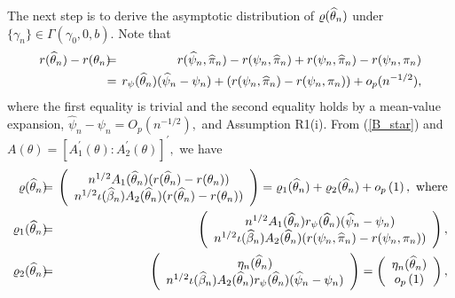 \documentclass[12pt,thmsb,titlepage,final,oneside,letterpaper]{article}
\begin{document}
The next step is to derive the asymptotic distribution of $\varrho (\widehat{%
\theta }_{n})$ under $\{\gamma _{n}\}\in \Gamma (\gamma _{0},0,b).$ Note that%
\begin{eqnarray}
r(\widehat{\theta }_{n})-r(\theta _{n})\hspace{-0.08in} &=&\hspace{-0.08in}r(%
\widehat{\psi }_{n},\widehat{\pi }_{n})-r(\psi _{n},\widehat{\pi }%
_{n})+r(\psi _{n},\widehat{\pi }_{n})-r(\psi _{n},\pi _{n})  \notag \\
&=&\hspace{-0.08in}r_{\psi }(\widehat{\theta }_{n})(\widehat{\psi }_{n}-\psi
_{n})+(r(\psi _{n},\widehat{\pi }_{n})-r(\psi _{n},\pi
_{n}))+o_{p}(n^{-1/2}),  \label{decomp}
\end{eqnarray}%
where the first equality is trivial and the second equality holds by a
mean-value expansion, $\widehat{\psi }_{n}-\psi _{n}=O_{p}(n^{-1/2}),$ and
Assumption R1(i). From (\ref{B_star}) and $A(\theta )=[A_{1}^{\prime
}(\theta ):A_{2}^{\prime }(\theta )]^{\prime },$ we have 
\begin{eqnarray}
\varrho (\widehat{\theta }_{n})\hspace{-0.08in} &=&\hspace{-0.08in}\left( 
\begin{array}{c}
n^{1/2}A_{1}(\widehat{\theta }_{n})(r(\widehat{\theta }_{n})-r(\theta _{n}))
\\ 
n^{1/2}\iota (\widehat{\beta }_{n})A_{2}(\widehat{\theta }_{n})(r(\widehat{%
\theta }_{n})-r(\theta _{n}))%
\end{array}%
\right) =\varrho _{1}(\widehat{\theta }_{n})+\varrho _{2}(\widehat{\theta }%
_{n})+o_{p}\left( 1\right) ,\text{ where}  \notag \\
\varrho _{1}(\widehat{\theta }_{n})\hspace{-0.08in} &=&\hspace{-0.08in}%
\left( 
\begin{array}{c}
n^{1/2}A_{1}(\widehat{\theta }_{n})r_{\psi }(\widehat{\theta }_{n})(\widehat{%
\psi }_{n}-\psi _{n}) \\ 
n^{1/2}\iota (\widehat{\beta }_{n})A_{2}(\widehat{\theta }_{n})(r(\psi _{n},%
\widehat{\pi }_{n})-r(\psi _{n},\pi _{n}))%
\end{array}%
\right) ,  \notag \\
\varrho _{2}(\widehat{\theta }_{n})\hspace{-0.08in} &=&\hspace{-0.08in}%
\left( 
\begin{array}{c}
\eta _{n}(\widehat{\theta }_{n}) \\ 
n^{1/2}\iota (\widehat{\beta }_{n})A_{2}(\widehat{\theta }_{n})r_{\psi }(%
\widehat{\theta }_{n})(\widehat{\psi }_{n}-\psi _{n})%
\end{array}%
\right) =\left( 
\begin{array}{c}
\eta _{n}(\widehat{\theta }_{n}) \\ 
o_{p}\left( 1\right)%
\end{array}%
\right) ,  \label{Varrho}
\end{eqnarray}%
\end{document}
